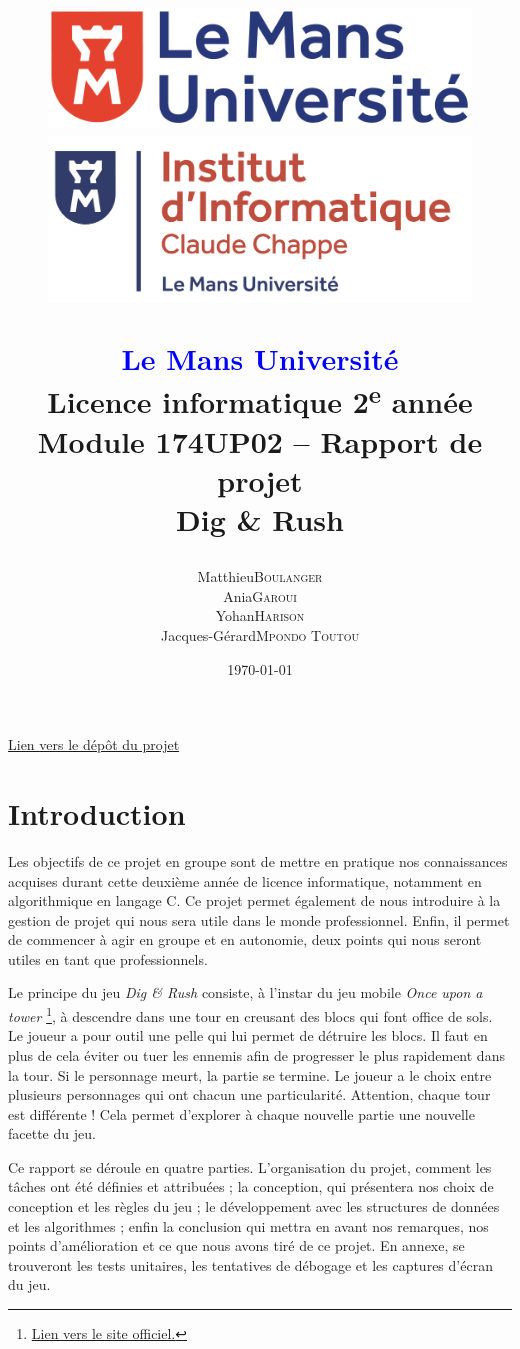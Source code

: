\documentclass[a4paper,12pt]{article}
\title{
    \begin{figure}[!t]
	\begin{minipage}{.25\textwidth}
	    \includegraphics[width=\textwidth]{img/logo_lmu.png}
	\end{minipage}
	\hspace{.5\textwidth}
	\begin{minipage}{.25\textwidth}
	    \includegraphics[width=\textwidth]{img/logo_ic2.png}
	\end{minipage}
    \end{figure}
    \begin{center}
	\textbf{\textcolor{blue}{Le Mans Université}} \\
	Licence informatique 2\textsuperscript{e} année \\
	Module 174UP02 – Rapport de projet \\
	\textbf{Dig \& Rush}
    \end{center}
}
\author{
	\begin{tabular}{rl}
	    Matthieu & \textsc{Boulanger} \\
	    Ania & \textsc{Garoui} \\
	    Yohan & \textsc{Harison} \\
	    Jacques-Gérard & \textsc{Mpondo Toutou}
	\end{tabular}
}
\date{\today}
\begin{document}
\maketitle
\begin{center}
    \href{https://github.com/idlusen/dig-and-rush/}{Lien vers le dépôt du projet}
\end{center}
\newpage

\tableofcontents
\newpage


\section{Introduction}

Les objectifs de ce projet en groupe sont de mettre en pratique nos connaissances acquises durant cette deuxième année de licence informatique, notamment en algorithmique en langage C.
Ce projet permet également de nous introduire à la gestion de projet qui nous sera utile dans le monde professionnel. 
Enfin, il permet de commencer à agir en groupe et en autonomie, deux points qui nous seront utiles en tant que professionnels.

Le principe du jeu \textit{Dig \& Rush} consiste, à l’instar du jeu mobile \textit{Once upon a tower} \footnote{\href{https://www.pomelogames.com/once-upon-a-tower}{Lien vers le site officiel.}}, à descendre dans une tour en creusant des blocs qui font office de sols. 
Le joueur a pour outil une pelle qui lui permet de détruire les blocs. 
Il faut en plus de cela éviter ou tuer les ennemis afin de progresser le plus rapidement dans la tour. 
Si le personnage meurt, la partie se termine. Le joueur a le choix entre plusieurs personnages qui ont chacun une particularité.
Attention, chaque tour est différente ! Cela permet d’explorer à chaque nouvelle partie une nouvelle facette du jeu.

Ce rapport se déroule en quatre parties. 
L’organisation du projet, comment les tâches ont été définies et attribuées ; la conception, qui présentera nos choix de conception et les règles du jeu ; le développement avec les structures de données et les algorithmes ; enfin la conclusion qui mettra en avant nos remarques, nos points d’amélioration et ce que nous avons tiré de ce projet. 
En annexe, se trouveront les tests unitaires, les tentatives de débogage et les captures d’écran du jeu.
\end{document}
